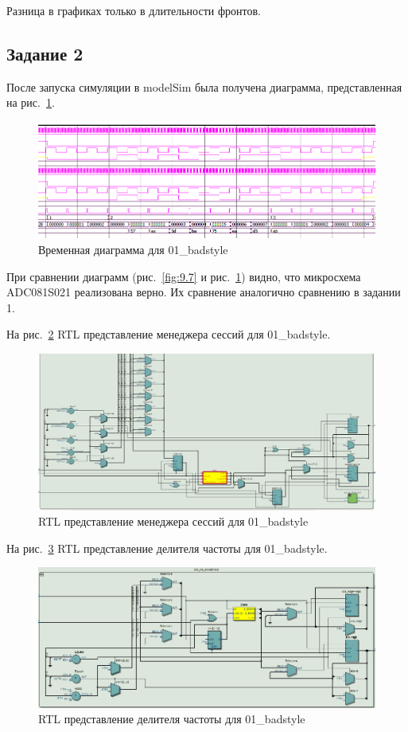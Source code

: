 \documentclass[a4paper,14pt]{article}
\begin{document}
	Разница в графиках только в длительности фронтов.	
		
	\subsection{Задание 2}

	После запуска симуляции в modelSim была получена диаграмма, представленная на рис.~\ref{fig:z15msimwvf}.
	
	\begin{figure}[H]
		\centering
		\includegraphics[width=0.9\linewidth]{images/z1_5_msim_wvf}
		\caption{Временная диаграмма для 01\_badstyle}
		\label{fig:z15msimwvf}
	\end{figure}

	При сравнении диаграмм (рис.~\ref{fig:9.7} и рис.~\ref{fig:z15msimwvf}) видно, что микросхема ADC081S021 реализована верно. Их сравнение аналогично сравнению в задании 1.
	
	На рис.~\ref{fig:z15rtl} RTL представление менеджера сессий для 01\_badstyle.
	
	\begin{figure}[H]
		\centering
		\includegraphics[width=0.9\linewidth]{images/z1_5_rtl}
		\caption{RTL представление менеджера сессий для 01\_badstyle}
		\label{fig:z15rtl}
	\end{figure}

	На рис.~\ref{fig:z15rtlclkdivider} RTL представление делителя частоты для 01\_badstyle.
	
	\begin{figure}[H]
		\centering
		\includegraphics[width=0.9\linewidth]{images/z1_5_rtl_clk_divider}
		\caption{RTL представление делителя частоты для 01\_badstyle}
		\label{fig:z15rtlclkdivider}
	\end{figure}
\end{document}
